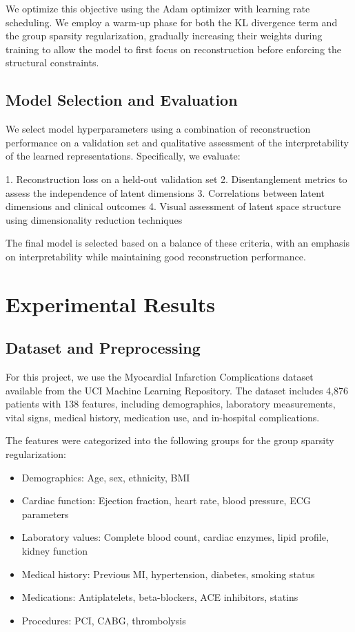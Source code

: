 \documentclass[oupdraft]{bio}
\begin{document}
We optimize this objective using the Adam optimizer with learning rate scheduling. We employ a warm-up phase for both the KL divergence term and the group sparsity regularization, gradually increasing their weights during training to allow the model to first focus on reconstruction before enforcing the structural constraints.

\subsection{Model Selection and Evaluation}

We select model hyperparameters using a combination of reconstruction performance on a validation set and qualitative assessment of the interpretability of the learned representations. Specifically, we evaluate:

1. Reconstruction loss on a held-out validation set
2. Disentanglement metrics to assess the independence of latent dimensions
3. Correlations between latent dimensions and clinical outcomes
4. Visual assessment of latent space structure using dimensionality reduction techniques

The final model is selected based on a balance of these criteria, with an emphasis on interpretability while maintaining good reconstruction performance.

\section{Experimental Results}
\label{sec4}

\subsection{Dataset and Preprocessing}

For this project, we use the Myocardial Infarction Complications dataset available from the UCI Machine Learning Repository. The dataset includes 4,876 patients with 138 features, including demographics, laboratory measurements, vital signs, medical history, medication use, and in-hospital complications.

The features were categorized into the following groups for the group sparsity regularization:
\begin{itemize}
    \item Demographics: Age, sex, ethnicity, BMI
    \item Cardiac function: Ejection fraction, heart rate, blood pressure, ECG parameters
    \item Laboratory values: Complete blood count, cardiac enzymes, lipid profile, kidney function
    \item Medical history: Previous MI, hypertension, diabetes, smoking status
    \item Medications: Antiplatelets, beta-blockers, ACE inhibitors, statins
    \item Procedures: PCI, CABG, thrombolysis
\end{itemize}
\end{document}
